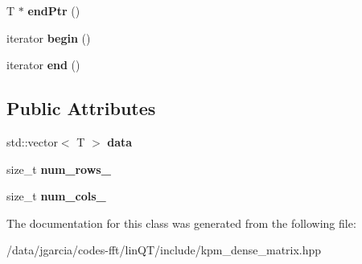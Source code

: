 \begin{DoxyCompactItemize}
\item 
T $\ast$ {\bfseries end\+Ptr} ()\hypertarget{classkpm_1_1dense__matrix_a636f76e4c995e950c261f832cfa7338c}{}\label{classkpm_1_1dense__matrix_a636f76e4c995e950c261f832cfa7338c}

\item 
iterator {\bfseries begin} ()\hypertarget{classkpm_1_1dense__matrix_a291b1bafc3e3c5be511ef7a4ae824103}{}\label{classkpm_1_1dense__matrix_a291b1bafc3e3c5be511ef7a4ae824103}

\item 
iterator {\bfseries end} ()\hypertarget{classkpm_1_1dense__matrix_a7ccb4423ed8fb793e03bc0637d53d1be}{}\label{classkpm_1_1dense__matrix_a7ccb4423ed8fb793e03bc0637d53d1be}

\end{DoxyCompactItemize}
\subsection*{Public Attributes}
\begin{DoxyCompactItemize}
\item 
std\+::vector$<$ T $>$ {\bfseries data}\hypertarget{classkpm_1_1dense__matrix_ae3ba8e0ac0ce477575d467fc0261a6ff}{}\label{classkpm_1_1dense__matrix_ae3ba8e0ac0ce477575d467fc0261a6ff}

\item 
size\+\_\+t {\bfseries num\+\_\+rows\+\_\+}\hypertarget{classkpm_1_1dense__matrix_a9b958847a24c6de0179f2eadf6cdbd72}{}\label{classkpm_1_1dense__matrix_a9b958847a24c6de0179f2eadf6cdbd72}

\item 
size\+\_\+t {\bfseries num\+\_\+cols\+\_\+}\hypertarget{classkpm_1_1dense__matrix_a0edc0fe90ff5f5aa9ad60b7f013fb72a}{}\label{classkpm_1_1dense__matrix_a0edc0fe90ff5f5aa9ad60b7f013fb72a}

\end{DoxyCompactItemize}


The documentation for this class was generated from the following file\+:\begin{DoxyCompactItemize}
\item 
/data/jgarcia/codes-\/fft/lin\+Q\+T/include/kpm\+\_\+dense\+\_\+matrix.\+hpp\end{DoxyCompactItemize}
